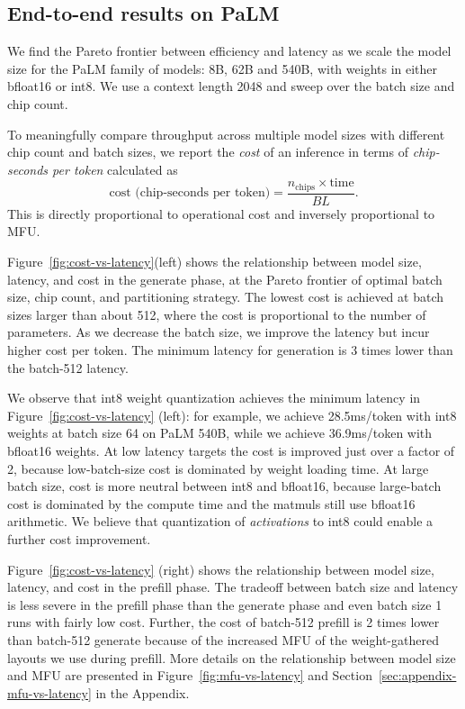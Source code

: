 \subsection{End-to-end results on PaLM}\label{sec:end-to-end-cost-vs-latency}
We find the Pareto frontier between efficiency and latency as we scale the model size for the PaLM family of models: 8B, 62B and 540B, with weights in either bfloat16 or int8. We use a context length 2048 and sweep over the batch size and chip count. 

To meaningfully compare throughput across multiple model sizes with different chip count and batch sizes, we report the \emph{cost} of an inference in terms of \emph{chip-seconds per token} calculated as
\[
    \textrm{cost (chip-seconds per token)} = \frac{n_{\textrm{chips}} \times \textrm{time}}{BL}.\]
This is directly proportional to operational cost and inversely proportional to MFU. 

Figure~\ref{fig:cost-vs-latency}(left) shows the relationship between model size, latency, and cost in the generate phase, at the Pareto frontier of optimal batch size, chip count, and partitioning strategy. The lowest cost is achieved at batch sizes larger than about 512, where the cost is proportional to the number of parameters. As we decrease the batch size, we improve the latency but incur higher cost per token. The minimum latency for generation is 3 times lower than the batch-512 latency. 

We observe that int8 weight quantization achieves the minimum latency in Figure~\ref{fig:cost-vs-latency} (left): for example, we achieve 28.5ms/token with int8 weights at batch size 64 on PaLM 540B, while we achieve 36.9ms/token with bfloat16 weights. At low latency targets the cost is improved just over a factor of 2, because low-batch-size cost is dominated by weight loading time. At large batch size, cost is more neutral between int8 and bfloat16, because large-batch cost is dominated by the compute time and the matmuls still use bfloat16 arithmetic. We believe that quantization of \emph{activations} to int8 could enable a further cost improvement.

Figure~\ref{fig:cost-vs-latency} (right) shows the relationship between model size, latency, and cost in the prefill phase. The tradeoff between batch size and latency is less severe in the prefill phase than the generate phase and even batch size 1 runs with fairly low cost. Further, the cost of batch-512 prefill is 2 times lower than batch-512 generate because of the increased MFU of the weight-gathered layouts we use during prefill. More details on the relationship between model size and MFU are presented in Figure~\ref{fig:mfu-vs-latency} and Section~\ref{sec:appendix-mfu-vs-latency} in the Appendix.

